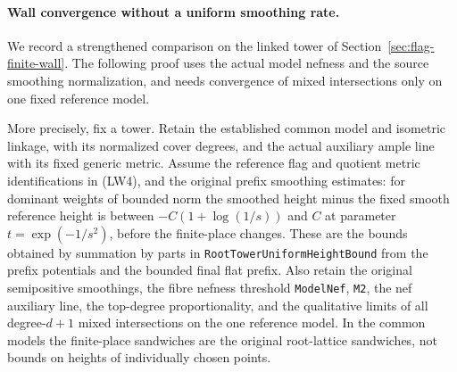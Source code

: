 \paragraph{Wall convergence without a uniform smoothing rate.}
We record a strengthened comparison on the linked tower
of Section~\ref{sec:flag-finite-wall}. The following proof uses
the actual model nefness and the source smoothing
normalization, and needs convergence of mixed intersections
only on one fixed reference model.

More precisely, fix a tower. Retain the established common
model and isometric linkage, with its normalized cover
degrees, and the actual auxiliary ample line with its fixed
generic metric. Assume the reference flag and quotient
metric identifications in (LW4), and the original prefix
smoothing estimates: for dominant weights of bounded norm
the smoothed height minus the fixed smooth reference height
is between \(-C(1+\log(1/s))\) and \(C\) at parameter
\(t=\exp(-1/s^2)\), before the finite-place changes.
These are the bounds obtained by summation by parts in
\texttt{RootTowerUniformHeightBound} from the prefix potentials
and the bounded final flat prefix. Also retain the original
semipositive smoothings, the fibre nefness threshold
\texttt{ModelNef}, \texttt{M2}, the nef auxiliary line,
the top-degree proportionality, and the qualitative limits
of all degree-\(d+1\) mixed intersections on the one reference
model. In the common models the finite-place sandwiches
are the original root-lattice sandwiches, not bounds on
heights of individually chosen points.


